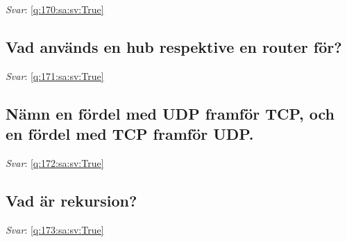 \documentclass[a4paper,11pt,oneside]{article}
\begin{document}
\begin{sloppypar}
\label{q:170:sa:sv:False}

\vspace{2cm}

\noindent\makebox[\textwidth]{\hrulefill}

\vspace{1cm}

\textit{Svar}: \autoref{q:170:sa:sv:True}



\subsection{Vad anv\"ands en hub respektive en router f\"or?}

\label{q:171:sa:sv:False}

\vspace{2cm}

\noindent\makebox[\textwidth]{\hrulefill}

\vspace{1cm}

\textit{Svar}: \autoref{q:171:sa:sv:True}



\subsection{N\"amn en f\"ordel med UDP framf\"or TCP, och en f\"ordel med TCP framf\"or UDP.}

\label{q:172:sa:sv:False}

\vspace{2cm}

\noindent\makebox[\textwidth]{\hrulefill}

\vspace{1cm}

\textit{Svar}: \autoref{q:172:sa:sv:True}



\subsection{Vad \"ar rekursion?}

\label{q:173:sa:sv:False}

\vspace{2cm}

\noindent\makebox[\textwidth]{\hrulefill}

\vspace{1cm}

\textit{Svar}: \autoref{q:173:sa:sv:True}




\end{sloppypar}
\end{document}
